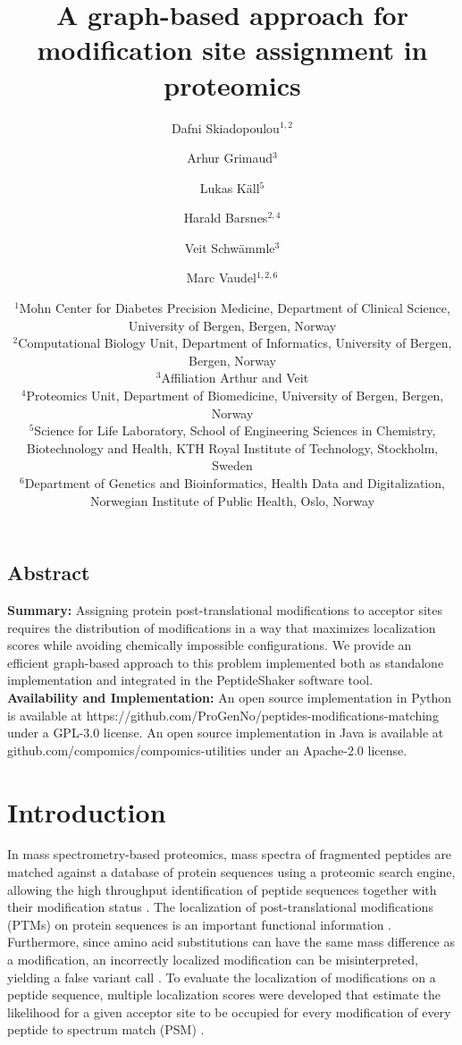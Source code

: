 \documentclass[]{article}
\title{A graph-based approach for modification site assignment in proteomics}
\author{Dafni Skiadopoulou$^{1,2}$ \and Arhur Grimaud$^{3}$ \and Lukas Käll$^{5}$ \and Harald Barsnes$^{2,4}$ \and Veit Schwämmle$^{3}$ \and Marc Vaudel$^{1,2,6}$}
\date{%
	$^1$Mohn Center for Diabetes Precision Medicine,
	Department of Clinical Science,
	University of Bergen, Bergen, Norway\\%
	$^2$Computational Biology Unit,
	Department of Informatics,
	University of Bergen, Bergen, Norway\\%
	$^3$Affiliation Arthur and Veit\\%
	$^4$Proteomics Unit, 
	Department of Biomedicine, 
	University of Bergen, Bergen, Norway\\%
	$^5$Science for Life Laboratory,
	School of Engineering Sciences in Chemistry, Biotechnology and Health,
	KTH Royal Institute of Technology, Stockholm, Sweden\\
	$^6$Department of Genetics and Bioinformatics, Health Data and Digitalization,
	Norwegian Institute of Public Health, Oslo, Norway\\
}
\begin{document}
	
\maketitle

\subsection*{Abstract} 

\textbf{Summary:} 
	Assigning protein post-translational modifications to acceptor sites requires the distribution of modifications in a way that maximizes localization scores while avoiding chemically impossible configurations. We provide an efficient graph-based approach to this problem implemented both as standalone implementation and integrated in the PeptideShaker software tool. \\
\textbf{Availability and Implementation:} 
	An open source implementation in Python is available at https://github.com/ProGenNo/peptides-modifications-matching under a GPL-3.0 license. An open source implementation in Java is available at github.com/compomics/compomics-utilities under an Apache-2.0 license. \\

\maketitle

\section{Introduction}

In mass spectrometry-based proteomics, mass spectra of fragmented peptides are matched against a database of protein sequences using a proteomic search engine, allowing the high throughput identification of peptide sequences together with their modification status \cite{Mass_spec_proteomics}. The localization of post-translational modifications (PTMs) on protein sequences is an important functional information \cite{Phosphoproteomics}. Furthermore, since amino acid substitutions can have the same mass difference as a modification, an incorrectly localized modification can be misinterpreted, yielding a false variant call \cite{SNPs_PTMs_same_mass}. To evaluate the localization of modifications on a peptide sequence, multiple localization scores were developed that estimate the likelihood for a given acceptor site to be occupied for every modification of every peptide to spectrum match (PSM) \cite{Localization_scoring, computational_phosphoproteomics}.
\end{document}
